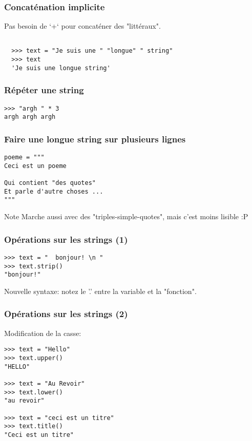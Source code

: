 \documentclass{beamer}
\begin{document}
\begin{frame}[fragile]
  \frametitle{Concaténation implicite}

Pas besoin de `+` pour concaténer des "littéraux".

\begin{lstlisting}

  >>> text = "Je suis une " "longue" " string"
  >>> text
  'Je suis une longue string'
\end{lstlisting}

\end{frame}


\begin{frame}[fragile]
  \frametitle{Répéter une string}

\begin{lstlisting}
>>> "argh " * 3
argh argh argh
\end{lstlisting}

\end{frame}


\begin{frame}[fragile]
  \frametitle{Faire une longue string sur plusieurs lignes}

\begin{lstlisting}
poeme = """
Ceci est un poeme

Qui contient "des quotes"
Et parle d'autre choses ...
"""
\end{lstlisting}

\begin{block}{Note}
Marche aussi avec des "triples-simple-quotes", mais c'est moins lisible :P
\end{block}
\end{frame}


\begin{frame}[fragile]
  \frametitle{Opérations sur les strings (1)}

\begin{lstlisting}
>>> text = "  bonjour! \n "
>>> text.strip()
"bonjour!"
\end{lstlisting}
Nouvelle syntaxe: notez le '.' entre la variable et la "fonction".
\end{frame}

\begin{frame}[fragile]
  \frametitle{Opérations sur les strings (2)}

Modification de la casse:

\begin{lstlisting}
>>> text = "Hello"
>>> text.upper()
"HELLO"

>>> text = "Au Revoir"
>>> text.lower()
"au revoir"

>>> text = "ceci est un titre"
>>> text.title()
"Ceci est un titre"
\end{lstlisting}

\end{frame}
\end{document}
